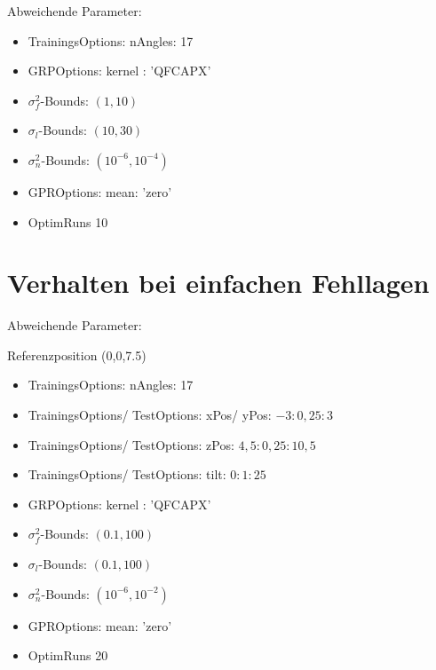 Abweichende Parameter:

\begin{itemize}
	\item TrainingsOptions: nAngles: 17
	\item GRPOptions: kernel : 'QFCAPX'
	\item $\sigma_f^2$-Bounds: $(1,10)$
	\item $\sigma_l$-Bounds: $(10,30)$
	\item $\sigma_n^2$-Bounds: $(10^{-6},10^{-4})$
	\item GPROptions: mean: 'zero'
	\item OptimRuns 10
\end{itemize}


\section{Verhalten bei einfachen Fehllagen}\label{sec:paramexp5}


Abweichende Parameter:

Referenzposition (0,0,7.5)

\begin{itemize}
	\item TrainingsOptions: nAngles: 17
	\item TrainingsOptions/ TestOptions: xPos/ yPos: $-3:0,25:3$
	\item TrainingsOptions/ TestOptions: zPos: $4,5:0,25:10,5$
	\item TrainingsOptions/ TestOptions: tilt: $0:1:25$
	\item GRPOptions: kernel : 'QFCAPX'
	\item $\sigma_f^2$-Bounds: $(0.1,100)$
	\item $\sigma_l$-Bounds: $(0.1,100)$
	\item $\sigma_n^2$-Bounds: $(10^{-6},10^{-2})$
	\item GPROptions: mean: 'zero'
	\item OptimRuns 20
\end{itemize}

